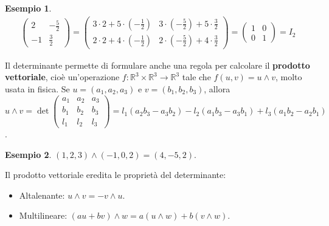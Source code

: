 \documentclass[a4paper]{article}
\theoremstyle{definition}
\newtheorem*{es}{Esempio}
\begin{document}
\begin{es}
\begin{align*}
\begin{pmatrix}
			                                     2  & -\frac{5}{2} \\
			                                     -1 & \frac{3}{2}
		                                     \end{pmatrix} = \begin{pmatrix}
			                                                     3 \cdot 2 + 5 \cdot ( - \frac{1}{2}) & 3 \cdot ( - \frac{5}{2}) + 5 \cdot \frac{3}{2} \\
			                                                     2 \cdot 2 + 4 \cdot ( - \frac{1}{2}) & 2 \cdot ( - \frac{5}{2}) + 4 \cdot \frac{3}{2}
		                                                     \end{pmatrix} = \begin{pmatrix}
			                                                                     1 & 0 \\
			                                                                     0 & 1
		                                                                     \end{pmatrix} = I_2
	\end{align*}
\end{es}
Il determinante permette di formulare anche una regola per calcolare il \textbf{prodotto vettoriale},
cioè un'operazione $f: \mathbb{R}^3 \times \mathbb{R}^3 \rightarrow \mathbb{R}^3$ tale che $f(u, v) = u \wedge v$, molto usata in fisica.
Se $u = (a_1, a_2, a_3)$ e $v = (b_1, b_2, b_3)$, allora $u \wedge v = \det \begin{pmatrix}
		a_1 & a_2 & a_3 \\
		b_1 & b_2 & b_3 \\
		l_1 & l_2 & l_3
	\end{pmatrix} = l_1(a_2b_3 - a_3b_2) - l_2(a_1b_3 - a_3b_1) + l_3(a_1b_2 - a_2b_1)$.
\begin{es}
	$(1, 2, 3) \wedge (-1, 0, 2) = (4, -5, 2)$.
\end{es}
Il prodotto vettoriale eredita le proprietà del determinante:
\begin{itemize}
	\item Altalenante: $u \wedge v = - v \wedge u$.
	\item Multilineare: $(au + bv) \wedge w = a(u \wedge w) + b(v \wedge w)$.
\end{itemize}
\end{document}
